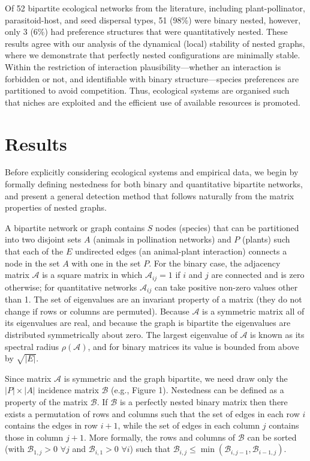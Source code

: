 \documentclass[pdftex]{nature}
\begin{document}
Of 52 bipartite ecological networks from the literature, including
plant-pollinator, parasitoid-host, and seed dispersal types, 51 (98\%)
were binary nested, however, only 3 (6\%) had preference structures
that were quantitatively nested.  These results agree with our
analysis of the dynamical (local) stability of nested graphs, where we
demonstrate that perfectly nested configurations are minimally stable.
Within the restriction of interaction plausibility---whether an
interaction is forbidden or not, and identifiable with binary
structure\cite{ForbiddenLinks}---species preferences are partitioned
to avoid competition.  Thus, ecological systems are organised such
that niches are exploited and the efficient use of available resources
is promoted.
  
 \section*{Results}
 \vspace{-0.5cm}
 Before explicitly considering ecological systems and
 empirical data, we begin by formally defining nestedness for both
 binary and quantitative bipartite networks, and present a general
 detection method that follows naturally from the matrix properties of
 nested graphs.

A bipartite network or graph contains $S$ nodes (species) that can be
partitioned into two disjoint sets $A$ (animals in pollination
networks) and $P$ (plants) such that each of the $E$ undirected edges
(an animal-plant interaction) connects a node in the set $A$ with one
in the set $P$.  For the binary case, the adjacency matrix $\mathcal
A$ is a square matrix in which $\mathcal A_{ij}=1$ if $i$ and $j$ are
connected and is zero otherwise; for quantitative networks $\mathcal
A_{ij}$ can take positive non-zero values other than 1.  The set of
eigenvalues are an invariant property of a matrix (they do not change
if rows or columns are permuted).  Because $\mathcal A$ is a symmetric
matrix all of its eigenvalues are real, and because the graph is
bipartite the eigenvalues are distributed symmetrically about zero.
The largest eigenvalue of $\mathcal A$ is known as its spectral radius
$\rho(\mathcal A)$, and for binary matrices its value is bounded from
above by $\sqrt{|E|}$\cite{andelic2011bounds,SpectralGraphTheory}.

Since matrix $\mathcal A$ is symmetric and the graph bipartite, we
need draw only the $|P| \times |A|$ incidence matrix $\mathcal B$
(e.g., Figure 1).  Nestedness can be defined as a property of the
matrix $\mathcal B$.  If $\mathcal B$ is a perfectly nested binary
matrix then there exists a permutation of rows and columns such that
the set of edges in each row $i$ contains the edges in row $i+1$,
while the set of edges in each column $j$ contains those in column
$j+1$.  More formally, the rows and columns of $\mathcal B$ can be
sorted (with $\mathcal B_{1,j}>0$ $\forall j$ and $\mathcal B_{i,1}>0$
$\forall i$) such that $\mathcal B_{i,j} \leq \min \left(\mathcal
B_{i,j-1}, \mathcal B_{i-1,j} \right)$.
\end{document}
